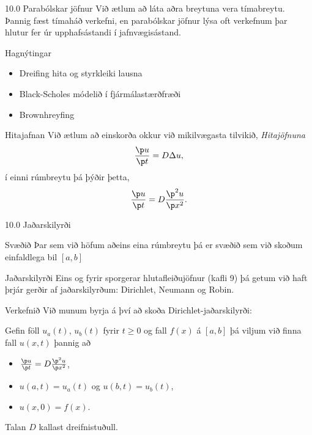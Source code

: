 \begin{frame}{10.0 Parabólskar jöfnur}
 Við ætlum að láta aðra breytuna vera tímabreytu. 
 Þannig fæst tímaháð verkefni, en parabólskar jöfnur lýsa oft verkefnum þar 
 hlutur fer úr upphafsástandi í jafnvægisástand. \pause
 
 \begin{block}{Hagnýtingar}
 \begin{itemize}
  \item Dreifing hita og styrkleiki lausna
  \item Black-Scholes módelið í fjármálastærðfræði
  \item Brownhreyfing
 \end{itemize}
 \end{block}
 
 \pause
 
 \begin{block}{Hitajafnan}
 Við ætlum að einskorða okkur við mikilvægasta tilvikið, \emph{Hitajöfnuna}
 $$
  \frac{\p u}{\p t} =  D \Delta u,
 $$\pause
 í einni rúmbreytu þá þýðir þetta, 
 $$
  \frac{\p u}{\p t} =  D\frac{\p^2 u}{\p x^2}.
 $$
 \end{block}
\end{frame}

\begin{frame}{10.0 Jaðarskilyrði}

\begin{block}{Svæðið}
 Þar sem við höfum aðeins eina rúmbreytu þá er svæðið sem við skoðum 
 einfaldlega bil $[a,b]$
\end{block}
  
\begin{block}{Jaðarskilyrði}
 Eins og fyrir sporgerar hlutafleiðujöfnur (kafli 9) þá getum við haft þrjár gerðir
 af jaðarskilyrðum: Dirichlet,
 Neumann og  Robin.
\end{block}

\begin{block}{Verkefnið}
Við munum byrja á því að skoða Dirichlet-jaðarskilyrði: \pause 

Gefin föll
$u_a(t)$, $u_b(t)$ fyrir $t\geq 0$ og fall $f(x)$ á $[a,b]$ þá viljum
við finna fall $u(x,t)$ þannig að \pause
\begin{itemize}
 \item $\frac{\p u}{\p t} =  D \frac{\p^2 u}{\p x^2}$, \pause
 \item $u(a,t) = u_a(t)$ og $u(b,t) = u_b(t)$, \pause
 \item $u(x,0) = f(x)$. \pause
\end{itemize}
Talan $D$ kallast dreifnistuðull.
\end{block}

\end{frame}

